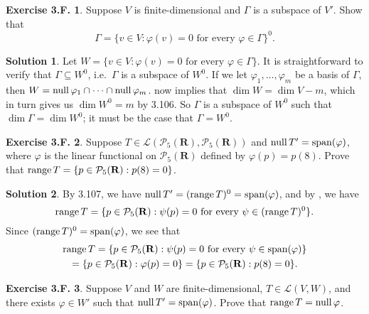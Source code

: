 \documentclass[12pt]{article}
\theoremstyle{definition}
\theoremstyle{exercise}
\newtheorem{exercise}{Exercise 3.F.}
\theoremstyle{solution}
\newtheorem*{solution}{Solution}
\newcommand{\poly}{\mathcal{P}}
\newcommand{\lmap}{\mathcal{L}}
\newcommand{\Span}{\text{span}}
\newcommand{\Null}{\text{null\,}}
\newcommand{\Range}{\text{range\,}}
\newcommand{\R}{\mathbf{R}}
\begin{document}
\begin{exercise}
\label{ex:26}
    Suppose \( V \) is finite-dimensional and \( \Gamma \) is a subspace of \( V' \). Show that
    \[
        \Gamma = \{ v \in V : \varphi(v) = 0 \text{ for every } \varphi \in \Gamma \}^0.
    \]
\end{exercise}

\begin{solution}
    Let \( W = \{ v \in V : \varphi(v) = 0 \text{ for every } \varphi \in \Gamma \} \). It is straightforward to verify that \( \Gamma \subseteq W^0 \), i.e.\ \( \Gamma \) is a subspace of \( W^0 \). If we let \( \varphi_1, \ldots, \varphi_m \) be a basis of \( \Gamma \), then \( W = \Null \varphi_1 \cap \cdots \cap \Null \varphi_m \).  now implies that \( \dim W = \dim V - m \), which in turn gives us \( \dim W^0 = m \) by 3.106. So \( \Gamma \) is a subspace of \( W^0 \) such that \( \dim \Gamma = \dim W^0 \); it must be the case that \( \Gamma = W^0 \).
\end{solution}

\begin{exercise}
\label{ex:27}
    Suppose \( T \in \lmap(\poly_5(\R), \poly_5(\R)) \) and \( \Null T' = \Span(\varphi) \), where \( \varphi \) is the linear functional on \( \poly_5(\R) \) defined by \( \varphi(p) = p(8) \). Prove that \( \Range T = \{ p \in \poly_5(\R) : p(8) = 0 \} \).
\end{exercise}

\begin{solution}
    By 3.107, we have \( \Null T' = (\Range T)^0 = \Span(\varphi) \), and by , we have
    \[
        \Range T = \{ p \in \poly_5(\R) : \psi(p) = 0 \text{ for every } \psi \in (\Range T)^0 \}.
    \]
    Since \( (\Range T)^0 = \Span(\varphi) \), we see that
    \begin{multline*}
        \Range T = \{ p \in \poly_5(\R) : \psi(p) = 0 \text{ for every } \psi \in \Span(\varphi) \} \\ = \{ p \in \poly_5(\R) : \varphi(p) = 0 \} = \{ p \in \poly_5(\R) : p(8) = 0 \}.
    \end{multline*}
\end{solution}

\begin{exercise}
\label{ex:28}
    Suppose \( V \) and \( W \) are finite-dimensional, \( T \in \lmap(V, W) \), and there exists \( \varphi \in W' \) such that \( \Null T' = \Span(\varphi) \). Prove that \( \Range T = \Null \varphi \).
\end{exercise}
\end{document}

